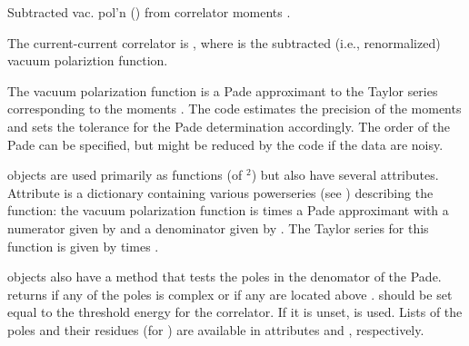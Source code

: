 \documentclass[letterpaper,10pt,english]{sphinxmanual}
\begin{document}
\begin{fulllineitems}
\label{\detokenize{g2tools:g2tools.vacpol}}
Subtracted vac. pol’n () from correlator moments .

The current-current correlator is , where
 is the subtracted (i.e., renormalized)
vacuum polariztion function.

The vacuum polarization function is a Pade approximant to the Taylor
series corresponding to the moments .  The code estimates the
precision of the moments and sets the tolerance for the Pade determination
accordingly. The order  of the Pade can be specified, but might
be reduced by the code if the data are noisy.

{\hyperref[\detokenize{g2tools:g2tools.vacpol}]{}} objects are used primarily as functions (of $^{\text{2}}$)
but also have several attributes. Attribute  is a dictionary
containing various powerseries (see ) describing the
function: the vacuum polarization function is  times a Pade
approximant  with a numerator given by  and a
denominator  given by . The Taylor series for this
function  is given by  times .

{\hyperref[\detokenize{g2tools:g2tools.vacpol}]{}} objects also have a method {\hyperref[\detokenize{g2tools:g2tools.vacpol.badpoles}]{}} that
tests the poles in the denomator of the Pade.  returns
 if any of the poles is complex or if any are located above
.  should be set equal to the threshold energy for
the correlator. If it is unset,  is used. Lists of the
poles and their residues (for ) are available in
attributes  and , respectively.


\end{fulllineitems}
\end{document}
